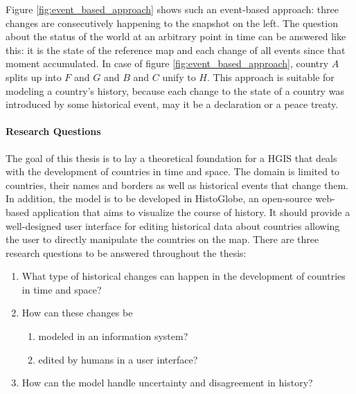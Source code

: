 Figure \ref{fig:event_based_approach} shows such an event-based approach: three changes are consecutively happening to the snapshot on the left. The question about the status of the world at an arbitrary point in time can be answered like this: it is the state of the reference map and each change of all events since that moment accumulated. In case of figure \ref{fig:event_based_approach}, country $A$ splits up into $F$ and $G$ and $B$ and $C$ unify to $H$. This approach is suitable for modeling a country's history, because each change to the state of a country was introduced by some historical event, may it be a declaration or a peace treaty.

\newpage
\paragraph{Research Questions} %
\label{par:research_questions}

The goal of this thesis is to lay a theoretical foundation for a HGIS that deals with the development of countries in time and space. The domain is limited to countries, their names and borders as well as historical events that change them. In addition, the model is to be developed in HistoGlobe, an open-source web-based application that aims to visualize the course of history. It should provide a well-designed user interface for editing historical data about countries allowing the user to directly manipulate the countries on the map. There are three research questions to be answered throughout the thesis:

\begin{enumerate}
  \item What type of historical changes can happen in the development of countries in time and space?
  \item How can these changes be
  \begin{enumerate}
    \item modeled in an information system?
    \item edited by humans in a user interface?
  \end{enumerate}
  \item How can the model handle uncertainty and disagreement in history?
\end{enumerate}


